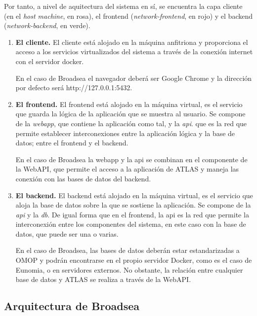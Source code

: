 {\begin{enumerate}
\end{enumerate}

Por tanto, a nivel de aquitectura del sistema en sí, se encuentra la capa cliente (en el \textit{host machine}, en rosa), el frontend (\textit{network-frontend}, en rojo) y el backend (\textit{network-backend}, en verde).

\begin{enumerate}

    \item \textbf{El cliente.} El cliente está alojado en la máquina anfitriona y proporciona el acceso a los servicios virtualizados del sistema a través de la conexión internet con el servidor docker.

     En el caso de Broadsea el navegador deberá ser Google Chrome y la dirección por defecto será http://127.0.0.1:5432.

    \item \textbf{El frontend.} El frontend está alojado en la máquina virtual, es el servicio que guarda la lógica de la aplicación que se muestra al usuario. Se compone de la \textit{webapp}, que contiene la aplicación como tal, y la \textit{api}. que es la red que permite establecer interconexiones entre la aplicación lógica y la base de datos; entre el frontend y el backend.

    En el caso de Broadsea la webapp y la api se combinan en el componente de la WebAPI, que permite el acceso a la aplicación de ATLAS y maneja las conexión con las bases de datos del backend.

    \item \textbf{El backend.} El backend está alojado en la máquina virtual, es el servicio que aloja la base de datos sobre la que se sostiene la aplicación. Se compone de la \textit{api} y la \textit{db}. De igual forma que en el frontend, la api es la red que permite la interconexión entre los componentes del sistema, en este caso con la base de datos, que puede ser una o varias.

    En el caso de Broadsea, las bases de datos deberán estar estandarizadas a OMOP y podrán encontrarse en el propio servidor Docker, como es el caso de Eunomia, o en servidores externos. No obstante, la relación entre cualquier base de datos y ATLAS se realiza a través de la WebAPI.

    
\end{enumerate}

\subsection{Arquitectura de Broadsea} \label{subsec:07Broadsea}

}

